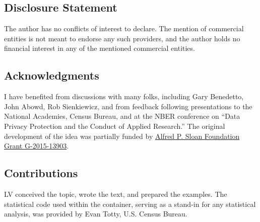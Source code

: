 \documentclass[]{hdsr}
\begin{document}
\subsection*{Disclosure Statement}
The author has no conflicts of interest to declare. The mention of commercial entities is not meant to endorse any such providers, and the author holds no financial interest in any of the mentioned commercial entities.

\subsection*{Acknowledgments}

I have benefited from discussions with many folks, including Gary Benedetto, John Abowd, Rob Sienkiewicz, and from feedback following presentations to the National Academies, Census Bureau, and at the NBER conference on ``Data Privacy Protection and the Conduct of Applied Research.'' The original development of the idea was partially funded by \href{https://sloan.org/grant-detail/6845}{Alfred P. Sloan Foundation Grant G-2015-13903}.

\subsection*{Contributions}

LV conceived the topic, wrote the text, and prepared the examples. The statistical code used within the container, serving as a stand-in for any statistical analysis, was provided by Evan Totty, U.S. Census Bureau.  


\appendix




\printbibliography


\end{document}
